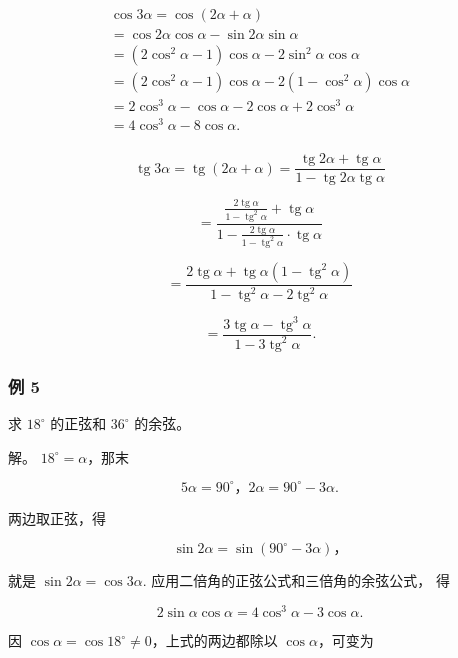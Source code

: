 \[
\begin{array}{l} \cos 3 \alpha = \cos (2 \alpha + \alpha) \\ = \cos 2 \alpha \cos \alpha - \sin 2 \alpha \sin \alpha \\ = (2 \cos^ {2} \alpha - 1) \cos \alpha - 2 \sin^ {2} \alpha \cos \alpha \\ = (2 \cos^ {2} \alpha - 1) \cos \alpha - 2 (1 - \cos^ {2} \alpha) \cos \alpha \\ = 2 \cos^ {3} \alpha - \cos \alpha - 2 \cos \alpha + 2 \cos^ {3} \alpha \\ = 4 \cos^ {3} \alpha - 8 \cos \alpha . \\ \end{array}
\]

\[
\operatorname{tg} 3 \alpha = \operatorname{tg} (2 \alpha + \alpha) = \frac {\operatorname{tg} 2 \alpha + \operatorname{tg} \alpha}{1 - \operatorname{tg} 2 \alpha \operatorname{tg} \alpha}
\]

\[
= \frac {\frac {2 \operatorname{tg} \alpha}{1 - \operatorname{tg} ^ {2} \alpha} + \operatorname{tg} \alpha}{1 - \frac {2 \operatorname{tg} \alpha}{1 - \operatorname{tg} ^ {2} \alpha} \cdot \operatorname{tg} \alpha}
\]

\[
= \frac {2 \operatorname{tg} \alpha + \operatorname{tg} \alpha (1 - \operatorname{tg} ^ {2} \alpha)}{1 - \operatorname{tg} ^ {2} \alpha - 2 \operatorname{tg} ^ {2} \alpha}
\]

\[
= \frac {3 \operatorname{tg} \alpha - \operatorname{tg} ^ {3} \alpha}{1 - 3 \operatorname{tg} ^ {2} \alpha}.
\]

\subsubsection{例 5}

求 \(18^{\circ}\) 的正弦和 \(36^{\circ}\) 的余弦。

 解。 \(18^{\circ} = \alpha\)，那末

\[
5 \alpha = 90 ^{\circ}\text{，} 2 \alpha = 90 ^{\circ} - 3 \alpha .
\]

两边取正弦，得

\[
\sin 2 \alpha = \sin (90 ^{\circ} - 3 \alpha)\text{，}
\]

就是 \(\sin 2\alpha = \cos 3\alpha.\)
应用二倍角的正弦公式和三倍角的余弦公式， 得

\[
2 \sin \alpha \cos \alpha = 4 \cos^ {3} \alpha - 3 \cos \alpha .
\]

因 \(\cos \alpha = \cos 18^{\circ} \neq 0\)，上式的两边都除以
\(\cos \alpha\)，可变为

